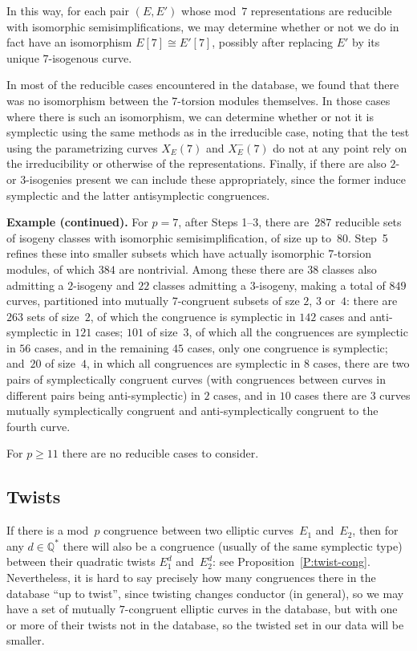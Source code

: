 \documentclass[12pt, reqno]{amsart}
\newcommand{\Q}{\mathbb{Q}}
\numberwithin{equation}{section}
\theoremstyle{definition}
\theoremstyle{remark}
\begin{document}

In this way, for each pair $(E,E')$ whose 
mod~$7$ representations
are reducible with isomorphic semisimplifications, we may determine
whether or not we do in fact have an isomorphism $E[7]\cong E'[7]$,
possibly after replacing $E'$ by its unique $7$-isogenous curve.

In most of the reducible cases encountered in the database, we found
that there was no isomorphism between the $7$-torsion modules
themselves.  In those cases where there is such an isomorphism, we can
determine whether or not it is symplectic using the same methods as in
the irreducible case, noting that the test using the parametrizing
curves $X_E(7)$ and $X_E^-(7)$ do not at any point rely on the
irreducibility or otherwise of the representations.  Finally, if there
are also $2$-{} or $3$-isogenies present we can include these
appropriately, since the former induce symplectic and the latter
antisymplectic congruences.

{\bf Example (continued).} For $p=7$, after Steps 1--3, there
are~$287$ reducible sets of isogeny classes with isomorphic
semisimplification, of size up to~$80$.  Step~5 refines these into
smaller subsets which have actually isomorphic $7$-torsion modules, of
which $384$ are nontrivial.  Among these there are $38$ classes also
admitting a $2$-isogeny and $22$ classes admitting a $3$-isogeny,
making a total of $849$ curves, partitioned into mutually
$7$-congruent subsets of sze $2$, $3$ or~$4$: there are $263$ sets of
size~$2$, of which the congruence is symplectic in $142$ cases and
anti-symplectic in $121$ cases; $101$ of size~$3$, of which all the
congruences are symplectic in $56$ cases, and in the remaining $45$
cases, only one congruence is symplectic; and~$20$ of size~$4$, in
which all congruences are symplectic in $8$ cases, there are two pairs
of symplectically congruent curves (with congruences between curves in
different pairs being anti-symplectic) in $2$ cases, and in $10$ cases
there are $3$ curves mutually symplectically congruent and
anti-symplectically congruent to the fourth curve.

For $p\ge11$ there are no reducible cases to consider.

\subsection{Twists}
If there is a mod~$p$ congruence between two elliptic curves~$E_1$
and~$E_2$, then for any $d\in\Q^*$ there will also be a congruence
(usually of the same symplectic type) between their quadratic twists
$E_1^d$ and~$E_2^d$: see Proposition~\ref{P:twist-cong}.
Nevertheless, it is hard to say precisely how many congruences there
in the database ``up to twist'', since twisting changes conductor (in
general), so we may have a set of mutually $7$-congruent elliptic
curves in the database, but with one or more of their twists not in
the database, so the twisted set in our data will be smaller.
\end{document}
